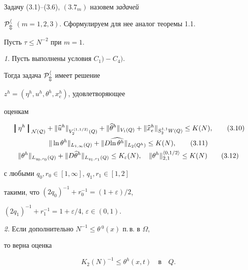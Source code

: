 \documentclass[12pt]{article}
\theoremstyle{plain} %
\newtheorem{thmm}{\hskip\parindent Теорема}[section]
\theoremstyle{definition}
\numberwithin{equation}{section}
\begin{document}
Задачу (3.1)--(3.6), $(3.7_m)$ назовем {\it задачей}


$\cal P^h_m$ $(m=1,2,3)$. Сформулируем для нее аналог теоремы 1.1.


Пусть $\tau\le N^{-2}$ при $m=1$.





\begin{thmm} {\em 1.} Пусть выполнены условия $C_1) - C_4)$.


Тогда задача $\cal P_m^h$ имеет решение


$z^h=(\eta^h,u^h,\theta^h,x_e^h)$, удовлетворяющее


оценкам


\begin{gather}


\left\bracevert\eta^h\right\bracevert_{\cal N(Q)}


+ \|\widehat u^h\|_{V_2^{\left<1,1/2\right>}(Q)}+


\|\widehat\theta^h\|_{V_1(Q)}


+\|\widehat x_e^h\|_{S_2^{1,1}W(Q)}\le K(N),


\tag{3.10}\\


%


\|\ln \theta^h\|_{L_{1,\infty}(Q)}+


\|D\widehat{\ln \theta^h}\|_{L_2(Q^h)}\le K(N), \tag{3.11}\\


%


\|\theta^h\|_{L_{q_{0},r_{0}}(Q)}+


\|D\widehat\theta^h\|_{L_{q_{1},r_{1}}(Q)}


\le K_\varepsilon (N),\quad


\|\theta^h\|^{\left<0,1/2\right>}_{2,1}\le K(N) \tag{3.12}


\end{gather}


с любыми $q_0,r_0\in [1,\infty]$, $q_1,r_1\in [1,2]$


такими, что $(2q_0)^{-1}+r_0^{-1}=(1+\varepsilon)/2$,


$(2q_1)^{-1}+r_1^{-1}=1+\varepsilon/4$, $\varepsilon\in (0,1)$.





{\em 2.} Если дополнительно $N^{-1}\le\theta\,^0(x)$ п.\,в. в $\Omega$,


то верна оценка


\begin{equation}


K_2(N)^{-1}\le\theta^h(x,t)\quad\text{в}\quad Q.\tag{3.13}


\end{equation}


\end{thmm}
\end{document}

